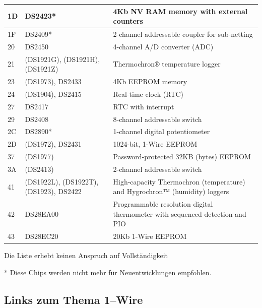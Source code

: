 \begin{center}
\begin{tabular}{|p{}|p{}|p{}|}
1D & DS2423*                              & 4Kb NV RAM memory with external counters \\ \hline
1F & DS2409*                              & 2-channel addressable coupler for sub-netting \\ \hline
20 & DS2450                               & 4-channel A/D converter (ADC) \\ \hline
21 & (DS1921G), (DS1921H), (DS1921Z)      & Thermochron® temperature logger \\ \hline
23 & (DS1973), DS2433                     & 4Kb EEPROM memory \\ \hline
24 & (DS1904), DS2415                     & Real-time clock (RTC) \\ \hline
27 & DS2417                               & RTC with interrupt \\ \hline
29 & DS2408                               & 8-channel addressable switch \\ \hline
2C & DS2890*                              & 1-channel digital potentiometer \\ \hline
2D & (DS1972), DS2431                     & 1024-bit, 1-Wire EEPROM \\ \hline
37 & (DS1977)                             & Password-protected 32KB (bytes) EEPROM \\ \hline
3A & (DS2413)                             & 2-channel addressable switch \\ \hline
41 & (DS1922L), (DS1922T), (DS1923), DS2422 & \raggedright High-capacity Thermochron (temperature) and Hygrochron™ (humidity) loggers \tabularnewline \hline
42 & DS28EA00                             & \raggedright Programmable resolution digital thermometer with sequenced detection and PIO \tabularnewline \hline
43 & DS28EC20                             & 20Kb 1-Wire EEPROM \\ \hline
\end{tabular}
\end{center}

Die Liste erhebt keinen Anspruch auf Vollständigkeit

* Diese Chips werden nicht mehr für Neuentwicklungen empfohlen.


\subsection{Links zum Thema 1--Wire}

\\
\\
\\

